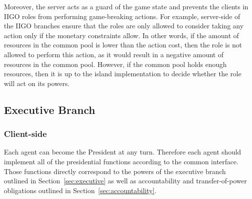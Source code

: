 Moreover, the server acts as a guard of the game state and prevents the clients in IIGO roles from performing game-breaking actions. For example, server-side of the IIGO branches ensure that the roles are only allowed to consider taking any action only if the monetary constraints allow. In other words, if the amount of resources in the common pool is lower than the action cost, then the role is not allowed to perform this action, as it would result in a negative amount of resources in the common pool. However, if the common pool holds enough resources, then it is up to the island implementation to decide whether the role will act on its powers.


\subsection{Executive Branch}


\subsubsection{Client-side}

\label{sub:president:client-side}
Each agent can become the President at any turn. Therefore each agent should implement all of the presidential functions according to the common interface. Those functions directly correspond to the powers of the executive branch outlined in Section~\ref{sec:executive} as well as accountability and transfer-of-power obligations outlined in Section~\ref{sec:accountability}. 

